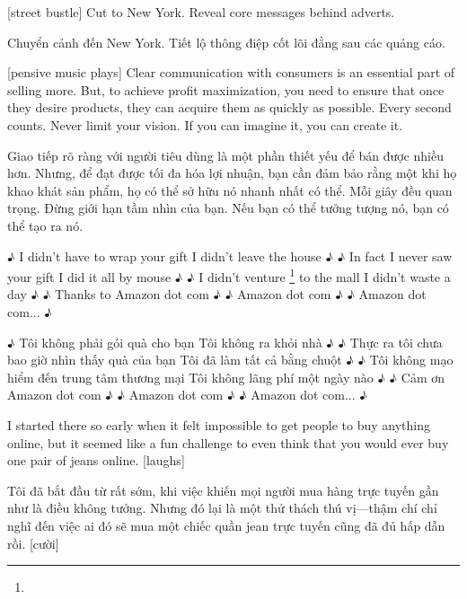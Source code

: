 \documentclass[a4paper]{article}
\begin{document}
	
	[street bustle]
	Cut to New York. Reveal core messages behind adverts.
	
	\begin{vietnamese-v2}
		Chuyển cảnh đến New York. Tiết lộ thông điệp cốt lõi đằng sau các quảng cáo.
	\end{vietnamese-v2}
	
	[pensive music plays]
	Clear communication with consumers is an essential part of selling more. But, to achieve profit maximization, you need to ensure that once they desire products, they can acquire them as quickly as possible.
	Every second counts.
	Never limit your vision.
	If you can imagine it, you can create it.
	
	\begin{vietnamese-v2}
		 Giao tiếp rõ ràng với người tiêu dùng là một phần thiết yếu để bán được nhiều hơn. Nhưng, để đạt được tối đa hóa lợi nhuận, bạn cần đảm bảo rằng một khi họ khao khát sản phẩm, họ có thể sở hữu nó nhanh nhất có thể. 
		Mỗi giây đều quan trọng. 
		Đừng giới hạn tầm nhìn của bạn. 
		Nếu bạn có thể tưởng tượng nó, bạn có thể tạo ra nó.
	\end{vietnamese-v2}
	
	
	♪ I didn't have to wrap your gift I didn't leave the house ♪
	♪ In fact I never saw your gift I did it all by mouse ♪
	♪ I didn't venture \footnote{} to the mall I didn't waste a day ♪
	♪ Thanks to Amazon dot com ♪
	♪ Amazon dot com ♪
	♪ Amazon dot com... ♪
	
	\begin{vietnamese-v2}
		♪ Tôi không phải gói quà cho bạn Tôi không ra khỏi nhà ♪
		♪ Thực ra tôi chưa bao giờ nhìn thấy quà của bạn Tôi đã làm tất cả bằng chuột ♪
		♪ Tôi không mạo hiểm đến trung tâm thương mại Tôi không lãng phí một ngày nào ♪
		♪ Cảm ơn Amazon dot com ♪
		♪ Amazon dot com ♪
		♪ Amazon dot com... ♪
	\end{vietnamese-v2}
	
	I started there so early when it felt impossible to get people to buy anything online, but it seemed like a fun challenge to even think that you would ever buy one pair of jeans online. [laughs]
	
	\begin{vietnamese-v2}
		Tôi đã bắt đầu từ rất sớm, khi việc khiến mọi người mua hàng trực tuyến gần như là điều không tưởng. 
		Nhưng đó lại là một thử thách thú vị—thậm chí chỉ nghĩ đến việc ai đó sẽ mua một chiếc quần jean trực tuyến cũng đã đủ hấp dẫn rồi. [cười]
	\end{vietnamese-v2}
	
\end{document}
